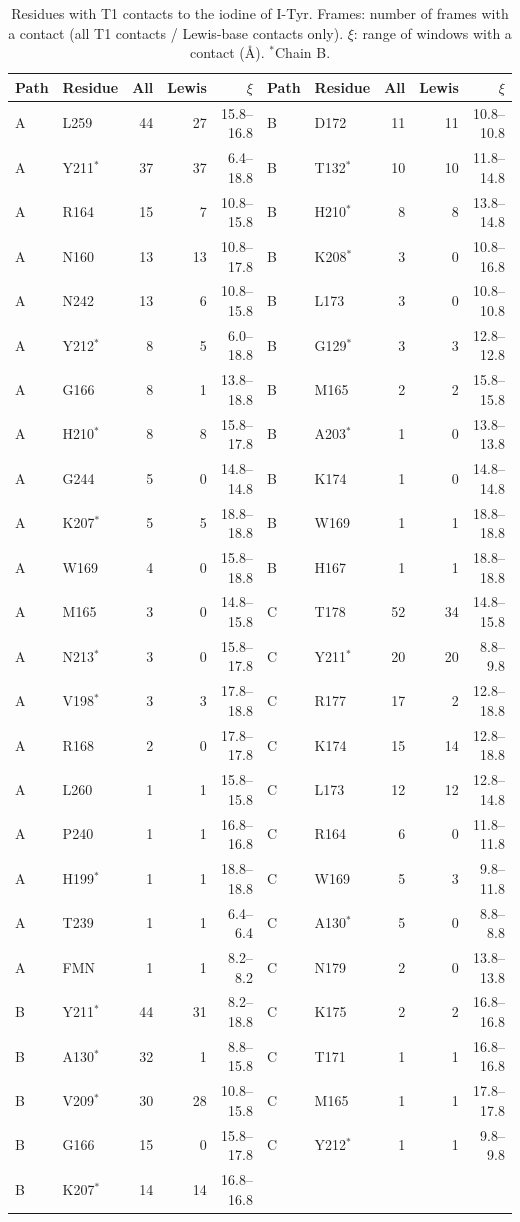 \begin{table}[!htbp]
\caption{Residues with T1 contacts to the iodine of I-Tyr. Frames: number of frames with a contact (all T1 contacts / Lewis-base contacts only). $\xi$: range of windows with a contact (\AA). $^{*}$Chain B.}
\label{tab:hiydres}
\centering\footnotesize\setlength{\tabcolsep}{3pt}
\begin{tabular}{llrrr|llrrr}
\toprule
Path & Residue & All & Lewis & $\xi$ & Path & Residue & All & Lewis & $\xi$ \\
\midrule
A & L259 & 44 & 27 & 15.8--16.8 & B & D172 & 11 & 11 & 10.8--10.8 \\
A & Y211$^{*}$ & 37 & 37 & 6.4--18.8 & B & T132$^{*}$ & 10 & 10 & 11.8--14.8 \\
A & R164 & 15 & 7 & 10.8--15.8 & B & H210$^{*}$ & 8 & 8 & 13.8--14.8 \\
A & N160 & 13 & 13 & 10.8--17.8 & B & K208$^{*}$ & 3 & 0 & 10.8--16.8 \\
A & N242 & 13 & 6 & 10.8--15.8 & B & L173 & 3 & 0 & 10.8--10.8 \\
A & Y212$^{*}$ & 8 & 5 & 6.0--18.8 & B & G129$^{*}$ & 3 & 3 & 12.8--12.8 \\
A & G166 & 8 & 1 & 13.8--18.8 & B & M165 & 2 & 2 & 15.8--15.8 \\
A & H210$^{*}$ & 8 & 8 & 15.8--17.8 & B & A203$^{*}$ & 1 & 0 & 13.8--13.8 \\
A & G244 & 5 & 0 & 14.8--14.8 & B & K174 & 1 & 0 & 14.8--14.8 \\
A & K207$^{*}$ & 5 & 5 & 18.8--18.8 & B & W169 & 1 & 1 & 18.8--18.8 \\
A & W169 & 4 & 0 & 15.8--18.8 & B & H167 & 1 & 1 & 18.8--18.8 \\
A & M165 & 3 & 0 & 14.8--15.8 & C & T178 & 52 & 34 & 14.8--15.8 \\
A & N213$^{*}$ & 3 & 0 & 15.8--17.8 & C & Y211$^{*}$ & 20 & 20 & 8.8--9.8 \\
A & V198$^{*}$ & 3 & 3 & 17.8--18.8 & C & R177 & 17 & 2 & 12.8--18.8 \\
A & R168 & 2 & 0 & 17.8--17.8 & C & K174 & 15 & 14 & 12.8--18.8 \\
A & L260 & 1 & 1 & 15.8--15.8 & C & L173 & 12 & 12 & 12.8--14.8 \\
A & P240 & 1 & 1 & 16.8--16.8 & C & R164 & 6 & 0 & 11.8--11.8 \\
A & H199$^{*}$ & 1 & 1 & 18.8--18.8 & C & W169 & 5 & 3 & 9.8--11.8 \\
A & T239 & 1 & 1 & 6.4--6.4 & C & A130$^{*}$ & 5 & 0 & 8.8--8.8 \\
A & FMN & 1 & 1 & 8.2--8.2 & C & N179 & 2 & 0 & 13.8--13.8 \\
B & Y211$^{*}$ & 44 & 31 & 8.2--18.8 & C & K175 & 2 & 2 & 16.8--16.8 \\
B & A130$^{*}$ & 32 & 1 & 8.8--15.8 & C & T171 & 1 & 1 & 16.8--16.8 \\
B & V209$^{*}$ & 30 & 28 & 10.8--15.8 & C & M165 & 1 & 1 & 17.8--17.8 \\
B & G166 & 15 & 0 & 15.8--17.8 & C & Y212$^{*}$ & 1 & 1 & 9.8--9.8 \\
B & K207$^{*}$ & 14 & 14 & 16.8--16.8 & & & & & \\
\bottomrule
\end{tabular}
\end{table}
